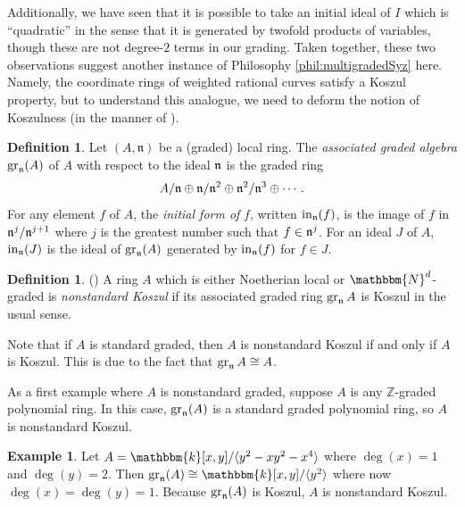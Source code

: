 \documentclass[12pt,reqno]{amsart}
\theoremstyle{definition}
\newtheorem{definition}[theorem]{Definition}
\newtheorem{example}[theorem]{Example}
\theoremstyle{remark}
\newcommand{\gr}{\operatorname{gr}}
\newcommand{\initial}{\operatorname{in}}
\newcommand{\bbN}{\mathbbm{N}}
\newcommand{\bbk}{\mathbbm{k}}
\begin{document}
Additionally, we have seen that it is possible to take an initial ideal of $I$ which is ``quadratic'' in the sense that it is generated by twofold products of variables, though these are not degree-$2$ terms in our grading. Taken together, these two observations suggest another instance of Philosophy \ref{phil:multigradedSyz} here.  Namely, the coordinate rings of weighted rational curves satisfy a Koszul property, but to understand this analogue, we need to deform the notion of Koszulness (in the manner of \cite[Definition~5.1]{hrwTKoszulPropIAffSemigroupRings}).

\begin{definition}
Let $(A, \mathfrak{n})$ be a (graded) local ring. The \textit{associated graded algebra} $\gr_\frak{n}(A)$ of $A$ with respect to the ideal $\frak n$ is the graded ring
\[
A/\frak n \oplus \frak n/\frak n^2 \oplus \frak n^2/\frak n^3 \oplus\cdots.
\] 
For any element $f$ of $A$, the \textit{initial form of} $f$, written $\initial_{\frak n}(f)$, is the image of $f$ in $\frak n^j/\frak n^{j+1}$ where $j$ is the greatest number such that $f \in \frak n^j$.  For an ideal $J$ of $A$, $\initial_{\frak n}(J)$ is the ideal of $\gr_\frak{n}(A)$ generated by $\initial_{\frak n}(f)$ for $f \in J$.
\end{definition}


\begin{definition}(\cite[cf.~Definition~5.1]{hrwTKoszulPropIAffSemigroupRings})
A ring $A$ which is either Noetherian local or $\bbN^d$-graded is \textit{nonstandard Koszul} if its associated graded ring $\gr_{\frak n} A$ is Koszul in the usual sense.
\end{definition} 

Note that if $A$ is standard graded, then $A$ is nonstandard Koszul if and only if $A$ is Koszul.  This is due to the fact that $\gr_{\frak n} A \cong A$.

As a first example where $A$ is nonstandard graded, suppose $A$ is any $\mathbb Z$-graded polynomial ring.  In this case, $\gr_{\frak n}(A)$ is a standard graded polynomial ring, so $A$ is nonstandard Koszul.

\begin{example}
    Let $A = \bbk[x,y]/\langle y^2 -xy^2 -x^4 \rangle$ where $\deg(x) = 1$ and $\deg(y) = 2$.  Then $\gr_{\frak n}(A) \cong \bbk[x,y]/\langle y^2 \rangle$ where now $\deg(x) = \deg(y) = 1$.  Because $\gr_{\frak n}(A)$ is Koszul, $A$ is nonstandard Koszul.
\end{example}
\end{document}
